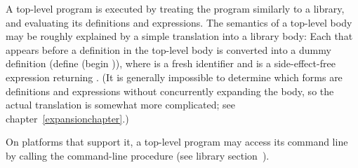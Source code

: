 A top-level program is executed by treating the program similarly to a library, and
evaluating its definitions and expressions.
The semantics of a top-level body may be roughly explained by
a simple translation into a library body: 
Each  that appears before a
definition in
the top-level body is converted into a dummy definition 
{\cf (define  (begin  ))},
where  is a fresh identifier and 
is a side-effect-free expression returning \unspecifiedreturn.
(It is generally impossible to determine which forms are 
definitions and expressions without concurrently expanding the body, so
the actual translation is somewhat more complicated; see
chapter~\ref{expansionchapter}.)

On platforms that support it, a top-level program may access its command line 
by calling the {\cf command-line} procedure (see library 
section~).

